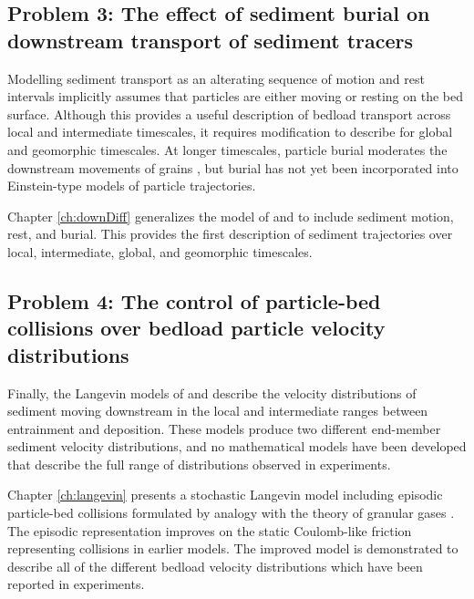 \subsection{Problem 3: The effect of sediment burial on downstream transport of sediment tracers}

Modelling sediment transport as an alterating sequence of motion and rest intervals implicitly assumes that particles are either moving or resting on the bed surface. Although this provides a useful description of bedload transport across local and intermediate timescales, it requires modification to describe for global and geomorphic timescales. 
At longer timescales, particle burial moderates the downstream movements of grains \citep{Hassan2017}, but burial has not yet been incorporated into Einstein-type models of particle trajectories. 

Chapter \ref{ch:downDiff} generalizes the model of \citet{Lisle1998} and \citet{Lajeunesse2017} to include sediment motion, rest, and burial.
This provides the first description of sediment trajectories over local, intermediate, global, and geomorphic timescales.

\subsection{Problem 4: The control of particle-bed collisions over bedload particle velocity distributions}

Finally, the Langevin models of \citet{Fan2014} and \citet{Ancey2014} describe the velocity distributions of sediment moving downstream in the local and intermediate ranges between entrainment and deposition.
These models produce two different end-member sediment velocity distributions, and no mathematical models have been developed that describe the full range of distributions observed in experiments.

Chapter \ref{ch:langevin} presents a stochastic Langevin model including episodic particle-bed collisions formulated by analogy with the theory of granular gases \citep{Brilliantov2004}.
The episodic representation improves on the static Coulomb-like friction representing collisions in earlier models.
The improved model is demonstrated to describe all of the different bedload velocity distributions which have been reported in experiments.

